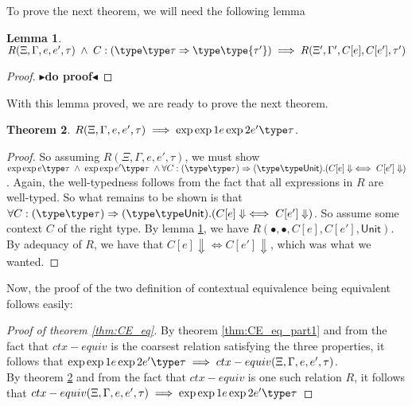 \documentclass[twoside,11pt,openright]{report}
\newtheorem{theorem}{Theorem}
\newtheorem{lemma}[theorem]{Lemma}
\theoremstyle{definition}
\newcommand{\expr}{e}
\newcommand{\ctx}{C}
\newcommand{\Tunit}{\mathsf{Unit}}
\newcommand{\typ}{\tau}
\newcommand{\venv}{\Gamma}
\newcommand{\tenv}{\Xi}
\newcommand{\empvenv}{\bullet}
\newcommand{\emptenv}{\bullet}
\def\envs#1#2\exp#3\type#4{#1 \; | \; #2 \; \vdash #3 : #4}
\def\envstyp#1#2\type#3{#1 \; | \; #2 \; \vdash #3}
\def\envscteq#1#2\exp1#3\exp2#4\type#5
\newcommand{\todo}[1]{{\color[rgb]{.5,0,0}\textbf{$\blacktriangleright$#1$\blacktriangleleft$}}}
\begin{document}
To prove the next theorem, we will need the following lemma
\begin{lemma}\label{lem:CE_eq_part2_helper}
  $R(\tenv, \venv, \expr, \expr', \typ) \; \land \; C:(\envstyp \tenv \venv \type \typ \Rightarrow \envstyp {\tenv'} {\venv'} \type {\typ'}) \implies R(\tenv', \venv', C[\expr], C[\expr'], \typ')$
\end{lemma}
\begin{proof}
  \todo{do proof}
\end{proof}
With this lemma proved, we are ready to prove the next theorem.
\begin{theorem}\label{thm:CE_eq_part2}
  $R(\tenv, \venv, \expr, \expr', \typ) \implies \envscteq \tenv \venv \exp1 \expr \exp2 \expr' \type \typ$.
\end{theorem}
\begin{proof}
  So assuming $R(\tenv, \venv, \expr, \expr', \typ)$, we must show 
  $ \envs \tenv \venv \exp \expr \type \typ \; \land \;
    \envs \tenv \venv \exp \expr' \type \typ \; \land\\
    \forall \ctx : (\envstyp \tenv \venv \type \typ) \Rightarrow (\envstyp {\emptenv} {\empvenv} \type \Tunit) . (\ctx[\expr] \Downarrow \iff \ctx[\expr'] \Downarrow)$. Again, the well-typedness follows from the fact that all expressions in $R$ are well-typed. So what remains to be shown is that $\forall \ctx : (\envstyp \tenv \venv \type \typ) \Rightarrow (\envstyp {\emptenv} {\empvenv} \type \Tunit) . (\ctx[\expr] \Downarrow \iff \ctx[\expr'] \Downarrow)$. So assume some context $C$ of the right type. By lemma \ref{lem:CE_eq_part2_helper}, we have $R(\emptenv, \empvenv, C[\expr], C[\expr'], \Tunit)$. By adequacy of $R$, we have that $\ctx[\expr] \Downarrow \iff \ctx[\expr'] \Downarrow$, which was what we wanted.
\end{proof}

Now, the proof of the two definition of contextual equivalence being equivalent follows easily:
\begin{proof}[Proof of theorem \ref{thm:CE_eq}]
  By theorem \ref{thm:CE_eq_part1} and from the fact that $ctx-equiv$ is the coarsest relation satisfying the three properties, it follows that $\envscteq \tenv \venv \exp1 \expr \exp2 \expr' \type \typ \implies ctx-equiv(\tenv, \venv, \expr, \expr', \typ)$.\\
  By theorem \ref{thm:CE_eq_part2} and from the fact that $ctx-equiv$ is one such relation $R$, it follows that $ctx-equiv(\tenv, \venv, \expr, \expr', \typ) \implies \envscteq \tenv \venv \exp1 \expr \exp2 \expr' \type \typ$
\end{proof}
\end{document}
